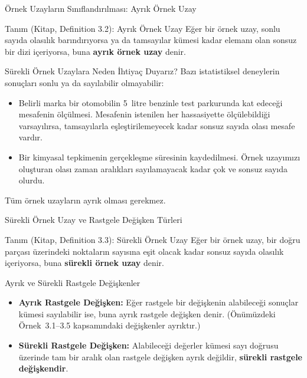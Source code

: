 \documentclass[light]{lutbeamer}
\begin{document}
\begin{frame}{Örnek Uzayların Sınıflandırılması: Ayrık Örnek Uzay}
    \begin{block}{Tanım (Kitap, Definition 3.2): Ayrık Örnek Uzay}
        Eğer bir örnek uzay, sonlu sayıda olasılık barındırıyorsa ya da tamsayılar kümesi kadar elemanı olan sonsuz bir dizi içeriyorsa, buna \textbf{ayrık örnek uzay} denir.
    \end{block}

    \begin{exampleblock}{Sürekli Örnek Uzaylara Neden İhtiyaç Duyarız?}
        Bazı istatistiksel deneylerin sonuçları sonlu ya da sayılabilir olmayabilir:
        \begin{itemize}
            \item Belirli marka bir otomobilin 5~litre benzinle test parkurunda kat edeceği mesafenin ölçülmesi. Mesafenin istenilen her hassasiyette ölçülebildiği varsayılırsa, tamsayılarla eşleştirilemeyecek kadar sonsuz sayıda olası mesafe vardır.
            \item Bir kimyasal tepkimenin gerçekleşme süresinin kaydedilmesi. Örnek uzayımızı oluşturan olası zaman aralıkları sayılamayacak kadar çok ve sonsuz sayıda olurdu.
        \end{itemize}
        Tüm örnek uzayların ayrık olması gerekmez.
    \end{exampleblock}
\end{frame}

\begin{frame}{Sürekli Örnek Uzay ve Rastgele Değişken Türleri}
    \begin{block}{Tanım (Kitap, Definition 3.3): Sürekli Örnek Uzay}
        Eğer bir örnek uzay, bir doğru parçası üzerindeki noktaların sayısına eşit olacak kadar sonsuz sayıda olasılık içeriyorsa, buna \textbf{sürekli örnek uzay} denir.
    \end{block}

    \begin{block}{Ayrık ve Sürekli Rastgele Değişkenler}
        \begin{itemize}
            \item \textbf{Ayrık Rastgele Değişken:} Eğer rastgele bir değişkenin alabileceği sonuçlar kümesi sayılabilir ise, buna ayrık rastgele değişken denir. (Önümüzdeki Örnek~3.1--3.5 kapsamındaki değişkenler ayrıktır.)
            \item \textbf{Sürekli Rastgele Değişken:} Alabileceği değerler kümesi sayı doğrusu üzerinde tam bir aralık olan rastgele değişken ayrık değildir, \textbf{sürekli rastgele değişkendir}.
        \end{itemize}
    \end{block}
\end{frame}
\end{document}
